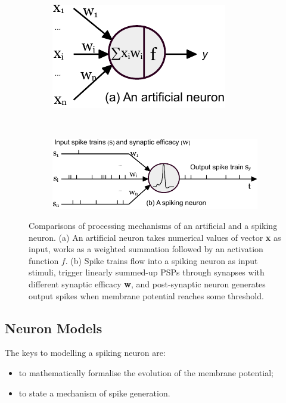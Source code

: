 	\begin{figure}[tb!]
		\centering
		\begin{subfigure}[t]{0.28\textwidth}
			\includegraphics[width=\textwidth]{pics_snn/neuron_ann.pdf}
		\end{subfigure}~
		\begin{subfigure}[t]{0.65\textwidth}
			\includegraphics[width=\textwidth]{pics_snn/neuron_snn.pdf}
		\end{subfigure}
		\caption{Comparisons of processing mechanisms of an artificial and a spiking neuron. (a) An artificial neuron takes numerical values of vector \textbf{x} as input, works as a weighted summation followed by an activation function $f$. (b) Spike trains flow into a spiking neuron as input stimuli, trigger linearly summed-up PSPs through synapses with different synaptic efficacy \textbf{w}, and post-synaptic neuron generates output spikes when membrane potential reaches some threshold.}
		\label{Fig:compare_as}
	\end{figure}
	
\subsection{Neuron Models}
\label{subsec:neuron_model}
The keys to modelling a spiking neuron are: 
\begin{itemize}
	\item to mathematically formalise the evolution of the membrane potential;
	\item to state a mechanism of spike generation.
\end{itemize}

